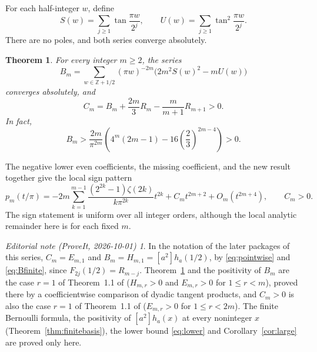 \documentclass[11pt,a4paper]{article}
\newtheorem{theorem}{Theorem}[section]
\theoremstyle{remark}\newtheorem*{ednote}{Editorial note (ProveIt, 2026-10-01)}
\newcommand{\Z}{\mathbb Z}\newcommand{\T}{\mathbb T}\newcommand{\E}{\mathcal E}
\begin{document}
For each half-integer $w$, define
\begin{equation}\label{eq:ST}
 S(w)=\sum_{j\ge1}\tan\frac{\pi w}{2^j},\qquad
 U(w)=\sum_{j\ge1}\tan^2\frac{\pi w}{2^j}.
\end{equation}
There are no poles, and both series converge absolutely.

\begin{theorem}\label{thm:main}
For every integer $m\ge2$, the series
\begin{equation}\label{eq:B}
 B_m=\sum_{w\in\Z+1/2}(\pi w)^{-2m}
       \bigl(2m^2S(w)^2-mU(w)\bigr)
\end{equation}
converges absolutely, and
\begin{equation}\label{eq:C}
 C_m=B_m+\frac{2m}{3}R_m-\frac{m}{m+1}R_{m+1}>0.
\end{equation}
In fact,
\begin{equation}\label{eq:lower}
 B_m>\frac{2m}{\pi^{2m}}
 \left(4^m(2m-1)-16\left(\frac23\right)^{2m-4}\right)>0.
\end{equation}
\end{theorem}
The negative lower even coefficients, the missing coefficient, and the new result together give the local sign pattern
\begin{equation}\label{eq:signpattern}
 p_m(t/\pi)=-2m\sum_{k=1}^{m-1}
 \frac{(2^{2k}-1)\zeta(2k)}{k\pi^{2k}}t^{2k}
 +C_mt^{2m+2}+O_m(t^{2m+4}),\qquad C_m>0.
\end{equation}
The sign statement is uniform over all integer orders, although the local analytic remainder here is for each fixed $m$.
\begin{ednote}
In the notation of the later packages of this series, $C_m=E_{m,1}$ and
$B_m=H_{m,1}=[a^2]h_a(1/2)$, by \eqref{eq:pointwise} and \eqref{eq:Bfinite}, since
$F_{2j}(1/2)=R_{m-j}$. Theorem~\ref{thm:main} and the positivity of $B_m$ are the case $r=1$
of Theorem~1.1 of  ($H_{m,r}>0$ and $E_{m,r}>0$ for
$1\le r<m$), proved there by a coefficientwise comparison of dyadic tangent products, and
$C_m>0$ is also the case $r=1$ of Theorem~1.1 of  ($E_{m,r}>0$
for $1\le r<2m$). The finite Bernoulli formula, the positivity of $[a^2]h_a(x)$ at every
noninteger $x$ (Theorem~\ref{thm:finitebasis}), the lower bound \eqref{eq:lower} and
Corollary~\ref{cor:large} are proved only here.
\end{ednote}
\end{document}
